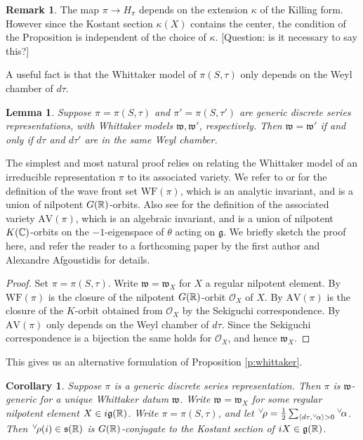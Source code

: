 \documentclass{article}
\newtheorem{lem}[thm]{Lemma}
\newtheorem{cor}[thm]{Corollary}
\theoremstyle{definition}
\newtheorem{rem}[thm]{Remark}
\numberwithin{equation}{section}
\renewcommand{\-}{\hyp{}}
\newcommand{\s}{\mathfrak s}
\newcommand{\g}{\mathfrak g}
\renewcommand{\O}{\mathcal O}
\newcommand{\w}{\mathfrak w}
\newcommand{\WF}{\mathrm{WF}}
\newcommand{\AV}{\mathrm{AV}}
\newcommand{\ch}[1]{\negthinspace\negthinspace\negthinspace\phantom{a}^\vee\negthinspace #1}
\begin{document}
\begin{rem}
  The map $\pi\rightarrow H_\pi$ depends on the extension $\kappa$ of the Killing form.
  However since the Kostant section $\kappa(X)$ contains the center, the condition of the Proposition is independent
  of the choice of  $\kappa$. [Question: is it necessary to say this?]
\end{rem}

A useful fact is that the Whittaker model of $\pi(S,\tau)$  only depends on the Weyl chamber of $d\tau$. 

\begin{lem}
Suppose $\pi=\pi(S,\tau)$ and $\pi'=\pi(S,\tau')$ are generic discrete series representations, with Whittaker models $\w,\w'$, respectively. 
Then $\w=\w'$ if and only if $d\tau$ and $d\tau'$ are in the same Weyl chamber.
\end{lem}

The simplest  and most natural proof relies on  relating the Whittaker model of an irreducible representation $\pi$ to its associated variety.
We refer to  \cite{howe_wave_front} or \cite{bv_local_structure} for the definition of the wave front set $\WF(\pi)$, which is an analytic invariant, and is a union of nilpotent $G(\mathbb{R})$-orbits.
Also see \cite{vogan_bowdoin} for the definition of the associated variety $\AV(\pi)$, which is an algebraic invariant, and is a union
of nilpotent $K(\mathbb{C})$-orbits on the $-1$-eigenspace of $\theta$ acting on $\g$.
We briefly sketch the proof here, and refer the reader to a forthcoming paper by the first author and Alexandre Afgoustidis for details.


\begin{proof}
Set $\pi=\pi(S,\tau)$.
Write $\w=\w_X$ for $X$ a regular nilpotent element. By \cite[Theorem A]{matumoto} $\WF(\pi)$
is the closure of the  nilpotent $G(\mathbb{R})$-orbit $\O_X$ of $X$. By \cite{SV1}  $\AV(\pi)$
is the closure of the $K$-orbit obtained from $\O_X$ by the Sekiguchi correspondence.
By \cite{yamashita} $\AV(\pi)$ only depends on the Weyl chamber of $d\tau$. Since the Sekiguchi correspondence is a bijection 
the same holds for $\O_X$, and hence $\w_X$.
\end{proof}

This gives us an alternative formulation of Proposition \ref{p:whittaker}.

\begin{cor}
\label{p:whittakeralt}
Suppose $\pi$ is a generic discrete series representation. Then $\pi$ is $\w$-generic
for a unique Whittaker datum $\w$.
Write $\w=\w_X$ for some regular nilpotent element $X\in i\g(\R)$.
Write $\pi=\pi(S,\tau)$, and let $\ch\rho=\frac12\sum_{\langle d\tau,\ch\alpha\rangle>0}\ch\alpha$. 
Then $\ch\rho(i)\in\s(\R)$ is $G(\mathbb{R})$-conjugate to the Kostant section of $iX\in \g(\R)$.
\end{cor}
  
\end{document}
